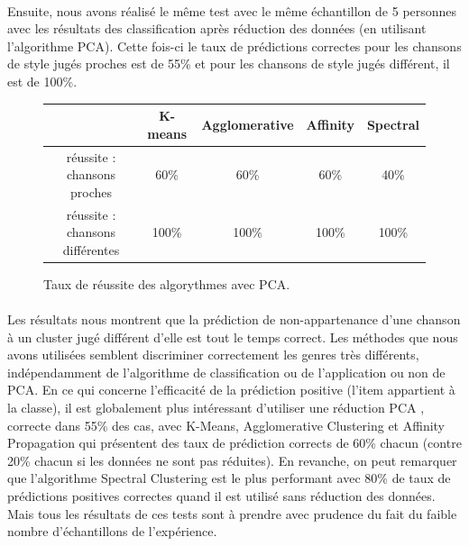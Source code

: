 \documentclass[soumission]{ir}
\begin{document}
\paragraph{}
Ensuite, nous avons réalisé le même test avec le même échantillon de 5 personnes avec les résultats des 
classification après réduction des données (en utilisant l’algorithme PCA). Cette fois-ci le taux de prédictions 
correctes pour les chansons de style jugés proches est de 55\% et pour les chansons de style jugés différent, il 
est de 100\%.

\begin{figure}[ht]
    \centering
    \begin{tabular}{ccccc}
        \phantom & K-means & Agglomerative & Affinity & Spectral\\
        \hline
        réussite : chansons proches & 60\%& 60\% & 60\% & 40\%\\
        réussite : chansons différentes & 100\% & 100\% & 100\% & 100\%\\
        \hline
    \end{tabular}
    \caption{Taux de réussite des algorythmes avec PCA.}
    \label{test_pca}
\end{figure}

\paragraph{}
Les résultats nous montrent que la prédiction de non-appartenance d’une chanson à un cluster jugé différent d’elle
est tout le temps correct. Les méthodes que nous avons utilisées semblent discriminer correctement les genres très 
différents, indépendamment de l’algorithme de classification ou de l’application ou non de PCA. En ce qui 
concerne l'efficacité de la prédiction positive (l’item appartient à la classe), il est globalement plus 
intéressant d’utiliser une réduction PCA , correcte dans 55\% des cas, avec K-Means, Agglomerative Clustering et 
Affinity Propagation qui présentent des taux de prédiction corrects de 60\% chacun (contre 20\% chacun si les 
données ne sont pas réduites). En revanche, on peut remarquer que l’algorithme Spectral Clustering est le plus 
performant avec 80\% de taux de prédictions positives correctes quand il est utilisé sans réduction des données. 
Mais tous les résultats de ces tests sont à prendre avec prudence du fait du faible nombre d'échantillons de 
l’expérience.

\paragraph{}
\end{document}

